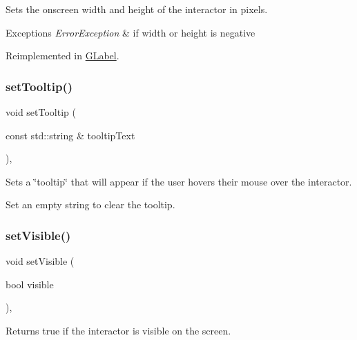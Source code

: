 Sets the onscreen width and height of the interactor in pixels. 


\begin{DoxyExceptions}{Exceptions}
{\em Error\+Exception} & if width or height is negative \\
\hline
\end{DoxyExceptions}


Reimplemented in \mbox{\hyperlink{classGLabel_a42d96e60c62d7770993327d7147d77b8}{G\+Label}}.

\mbox{\label{classGInteractor_a039e0e49beaecc275efce02d416acea8}} 
\subsubsection{\texorpdfstring{set\+Tooltip()}{setTooltip()}}
{\footnotesize\ttfamily void set\+Tooltip (\begin{DoxyParamCaption}\item[{const std\+::string \&}]{tooltip\+Text }\end{DoxyParamCaption})\hspace{0.3cm}{\ttfamily [virtual]}, {\ttfamily [inherited]}}



Sets a \char`\"{}tooltip\char`\"{} that will appear if the user hovers their mouse over the interactor. 

Set an empty string to clear the tooltip. \mbox{\label{classGInteractor_a18e44e30b31525a243960ca3928125aa}} 
\subsubsection{\texorpdfstring{set\+Visible()}{setVisible()}}
{\footnotesize\ttfamily void set\+Visible (\begin{DoxyParamCaption}\item[{bool}]{visible }\end{DoxyParamCaption})\hspace{0.3cm}{\ttfamily [virtual]}, {\ttfamily [inherited]}}



Returns true if the interactor is visible on the screen. 

